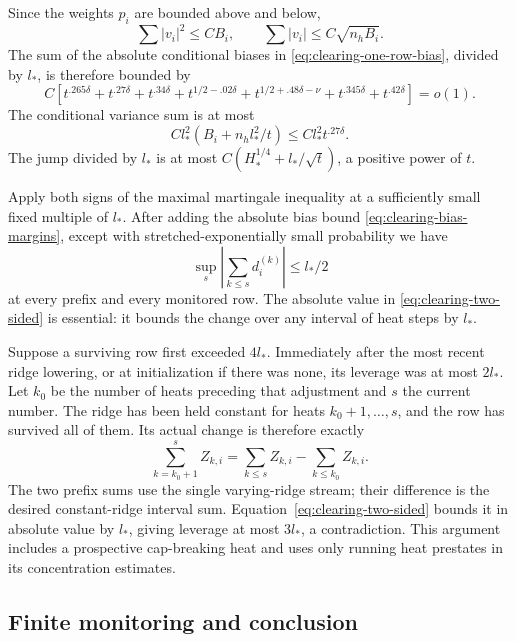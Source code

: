 Since the weights $p_i$ are bounded above and below,
\[
 \sum|v_i|^2\le CB_i,\qquad
 \sum|v_i|\le C\sqrt{n_hB_i}.
\]
The sum of the absolute conditional biases in
\eqref{eq:clearing-one-row-bias}, divided by $l_*$, is therefore bounded by
\begin{equation}\label{eq:clearing-bias-margins}
 C\left[
 t^{.265\delta}+t^{.27\delta}+t^{.34\delta}
 +t^{1/2-.02\delta}+t^{1/2+.48\delta-\nu}
 +t^{.345\delta}+t^{.42\delta}\right]=o(1).
\end{equation}
The conditional variance sum is at most
\begin{equation}\label{eq:clearing-leverage-variance}
 Cl_*^2\left(B_i+n_hl_*^2/t\right)
 \le Cl_*^2t^{.27\delta}.
\end{equation}
The jump divided by $l_*$ is at most
$C(H_*^{1/4}+l_*/\sqrt t)$, a positive power of $t$.

Apply both signs of the maximal martingale inequality at a sufficiently small
fixed multiple of $l_*$.  After adding the absolute bias bound
\eqref{eq:clearing-bias-margins}, except with stretched-exponentially small
probability we have
\begin{equation}\label{eq:clearing-two-sided}
 \sup_s\left|\sum_{k\le s}d_i^{(k)}\right|\le l_*/2
\end{equation}
at every prefix and every monitored row.  The absolute value in
\eqref{eq:clearing-two-sided} is essential: it bounds the change over any
interval of heat steps by $l_*$.

Suppose a surviving row first exceeded $4l_*$.  Immediately after the most
recent ridge lowering, or at initialization if there was none, its leverage
was at most $2l_*$.  Let $k_0$ be the number of heats preceding that adjustment and $s$ the
current number.  The ridge has been held constant for heats $k_0+1,\ldots,s$,
and the row has survived all of them.  Its actual change is therefore exactly
\[
 \sum_{k=k_0+1}^s Z_{k,i}
   =\sum_{k\le s}Z_{k,i}-\sum_{k\le k_0}Z_{k,i}.
\]
The two prefix sums use the single varying-ridge stream; their difference
is the desired constant-ridge interval sum.  Equation~\eqref{eq:clearing-two-sided}
bounds it in absolute value by $l_*$, giving leverage at most $3l_*$,
a contradiction. This argument includes a prospective cap-breaking heat and
uses only running heat prestates in its concentration estimates.

\subsection{Finite monitoring and conclusion}

